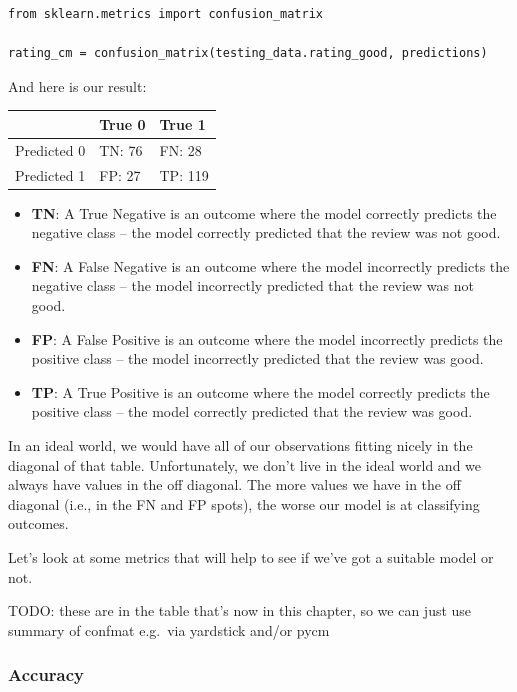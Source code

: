 \documentclass[
  letterpaper,
]{krantz}
\begin{document}
\begin{verbatim}
from sklearn.metrics import confusion_matrix

rating_cm = confusion_matrix(testing_data.rating_good, predictions)
\end{verbatim}

And here is our result:

\begin{longtable*}{cll}
\toprule
  & True 0 & True 1 \\ 
\midrule\addlinespace[2.5pt]
Predicted 0 & TN: 76 & FN: 28 \\ 
Predicted 1 & FP: 27 & TP: 119 \\ 
\bottomrule
\end{longtable*}

\begin{itemize}
\item
  \textbf{TN}: A True Negative is an outcome where the model correctly
  predicts the negative class -- the model correctly predicted that the
  review was not good.
\item
  \textbf{FN}: A False Negative is an outcome where the model
  incorrectly predicts the negative class -- the model incorrectly
  predicted that the review was not good.
\item
  \textbf{FP}: A False Positive is an outcome where the model
  incorrectly predicts the positive class -- the model incorrectly
  predicted that the review was good.
\item
  \textbf{TP}: A True Positive is an outcome where the model correctly
  predicts the positive class -- the model correctly predicted that the
  review was good.
\end{itemize}

In an ideal world, we would have all of our observations fitting nicely
in the diagonal of that table. Unfortunately, we don't live in the ideal
world and we always have values in the off diagonal. The more values we
have in the off diagonal (i.e., in the FN and FP spots), the worse our
model is at classifying outcomes.

Let's look at some metrics that will help to see if we've got a suitable
model or not.

TODO: these are in the table that's now in this chapter, so we can just
use summary of confmat e.g.~via yardstick and/or pycm

\subsubsection{Accuracy}\label{accuracy}
\end{document}
